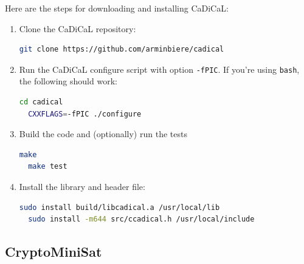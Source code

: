 \documentclass[11pt,twoside,fleqn,openright,titlepage]{cslreport}
\begin{document}
Here are the steps for downloading and installing CaDiCaL:
\begin{enumerate}
\item Clone the CaDiCaL repository:
\begin{small}
\begin{lstlisting}[language=sh]
  git clone https://github.com/arminbiere/cadical
\end{lstlisting}
\end{small}
\item Run the CaDiCaL configure script with option \texttt{-fPIC}. If
  you're using \texttt{bash}, the following should work:
\begin{small}
\begin{lstlisting}[language=sh,deletekeywords={cd}]
  cd cadical
  CXXFLAGS=-fPIC ./configure
\end{lstlisting}
\end{small}
\item Build the code and (optionally) run the tests
\begin{small}
\begin{lstlisting}[language=sh,deletekeywords={test}]
  make
  make test
\end{lstlisting}
\end{small}
\item Install the library and header file:
\begin{small}
\begin{lstlisting}[language=sh]
  sudo install build/libcadical.a /usr/local/lib
  sudo install -m644 src/ccadical.h /usr/local/include
\end{lstlisting}
\end{small}
\end{enumerate}

\subsection*{CryptoMiniSat}
\end{document}
